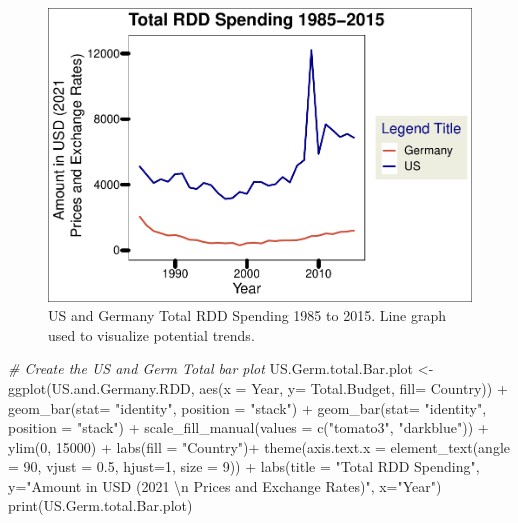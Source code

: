 \documentclass[
  12pt,
]{article}
\newenvironment{Shaded}{\begin{snugshade}}{\end{snugshade}}
\newcommand{\AttributeTok}[1]{\textcolor[rgb]{0.77,0.63,0.00}{#1}}
\newcommand{\CommentTok}[1]{\textcolor[rgb]{0.56,0.35,0.01}{\textit{#1}}}
\newcommand{\DecValTok}[1]{\textcolor[rgb]{0.00,0.00,0.81}{#1}}
\newcommand{\FloatTok}[1]{\textcolor[rgb]{0.00,0.00,0.81}{#1}}
\newcommand{\FunctionTok}[1]{\textcolor[rgb]{0.00,0.00,0.00}{#1}}
\newcommand{\NormalTok}[1]{#1}
\newcommand{\OtherTok}[1]{\textcolor[rgb]{0.56,0.35,0.01}{#1}}
\newcommand{\SpecialCharTok}[1]{\textcolor[rgb]{0.00,0.00,0.00}{#1}}
\newcommand{\StringTok}[1]{\textcolor[rgb]{0.31,0.60,0.02}{#1}}
\begin{document}
\begin{figure}
\centering
\includegraphics{Chang_Jenkins_Mullens_ENV872_Final_files/figure-latex/Germany and US Line Plot for total budget-1.pdf}
\caption{US and Germany Total RDD Spending 1985 to 2015. Line graph used
to visualize potential trends.}
\end{figure}

\begin{Shaded}
\begin{Highlighting}[]
\CommentTok{\# Create the US and Germ Total bar plot}
\NormalTok{US.Germ.total.Bar.plot }\OtherTok{\textless{}{-}} \FunctionTok{ggplot}\NormalTok{(US.and.Germany.RDD, }\FunctionTok{aes}\NormalTok{(}\AttributeTok{x =}\NormalTok{ Year, }\AttributeTok{y=}\NormalTok{ Total.Budget, }\AttributeTok{fill=}\NormalTok{ Country)) }\SpecialCharTok{+}
  \FunctionTok{geom\_bar}\NormalTok{(}\AttributeTok{stat=} \StringTok{"identity"}\NormalTok{, }\AttributeTok{position =} \StringTok{"stack"}\NormalTok{) }\SpecialCharTok{+}
  \FunctionTok{geom\_bar}\NormalTok{(}\AttributeTok{stat=} \StringTok{"identity"}\NormalTok{, }\AttributeTok{position =} \StringTok{"stack"}\NormalTok{) }\SpecialCharTok{+}
  \FunctionTok{scale\_fill\_manual}\NormalTok{(}\AttributeTok{values =} \FunctionTok{c}\NormalTok{(}\StringTok{"tomato3"}\NormalTok{, }\StringTok{"darkblue"}\NormalTok{)) }\SpecialCharTok{+}
  \FunctionTok{ylim}\NormalTok{(}\DecValTok{0}\NormalTok{, }\DecValTok{15000}\NormalTok{) }\SpecialCharTok{+}
  \FunctionTok{labs}\NormalTok{(}\AttributeTok{fill =} \StringTok{"Country"}\NormalTok{)}\SpecialCharTok{+}
  \FunctionTok{theme}\NormalTok{(}\AttributeTok{axis.text.x =} \FunctionTok{element\_text}\NormalTok{(}\AttributeTok{angle =} \DecValTok{90}\NormalTok{, }\AttributeTok{vjust =} \FloatTok{0.5}\NormalTok{, }\AttributeTok{hjust=}\DecValTok{1}\NormalTok{, }\AttributeTok{size =} \DecValTok{9}\NormalTok{)) }\SpecialCharTok{+}
  \FunctionTok{labs}\NormalTok{(}\AttributeTok{title =} \StringTok{"Total RDD Spending"}\NormalTok{,}
       \AttributeTok{y=}\StringTok{"Amount in USD (2021 }\SpecialCharTok{\textbackslash{}n}\StringTok{ Prices and Exchange Rates)"}\NormalTok{,}
       \AttributeTok{x=}\StringTok{"Year"}\NormalTok{)}
\FunctionTok{print}\NormalTok{(US.Germ.total.Bar.plot)}
\end{Highlighting}
\end{Shaded}
\end{document}
